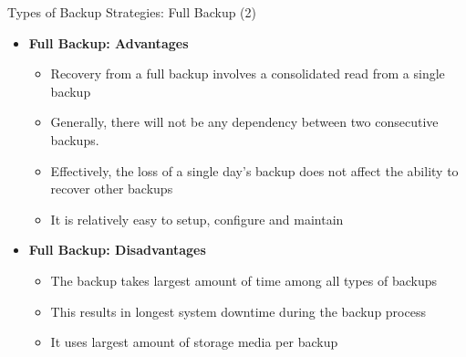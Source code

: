\documentclass[aspectratio=169, xcolor=dvipsnames]{beamer}
\begin{document}
\begin{frame}{Types of Backup Strategies: Full Backup (2)}
    \begin{itemize}[<+->]
        \item \textbf{Full Backup: Advantages}
        \begin{itemize}
            \item[$\triangleright$] Recovery from a full backup involves a consolidated read from a single backup
            \item[$\triangleright$] Generally, there will not be any dependency between two consecutive backups.
            \item[$\triangleright$] Effectively, the loss of a single day's backup does not affect the ability to recover other backups
            \item[$\triangleright$] It is relatively easy to setup, configure and maintain
        \end{itemize}
        \item \textbf{Full Backup: Disadvantages}
        \begin{itemize}
            \item[$\triangleright$] The backup takes largest amount of time among all types of backups
            \item[$\triangleright$] This results in longest system downtime during the backup process
            \item[$\triangleright$] It uses largest amount of storage media per backup
        \end{itemize}
    \end{itemize}
\end{frame}
\end{document}
